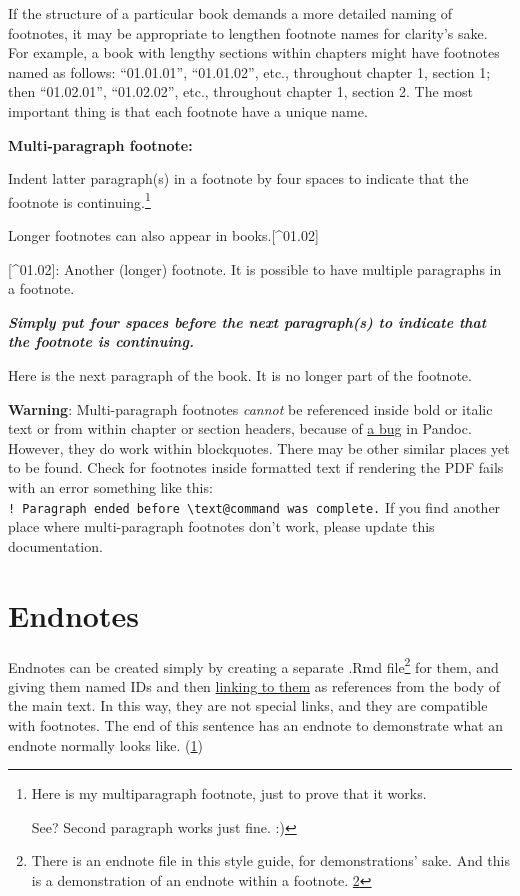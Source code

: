 \documentclass[
  english,
]{book}
\newenvironment{Shaded}{\begin{snugshade}}{\end{snugshade}}
\newcommand{\InformationTok}[1]{\textcolor[rgb]{0.56,0.35,0.01}{\textbf{\textit{#1}}}}
\newcommand{\NormalTok}[1]{#1}
\newcommand{\OtherTok}[1]{\textcolor[rgb]{0.56,0.35,0.01}{#1}}
\begin{document}
If the structure of a particular book demands a more detailed naming of footnotes, it may be appropriate to lengthen footnote names for clarity's sake. For example, a book with lengthy sections within chapters might have footnotes named as follows: ``01.01.01'', ``01.01.02'', etc., throughout chapter 1, section 1; then ``01.02.01'', ``01.02.02'', etc., throughout chapter 1, section 2. The most important thing is that each footnote have a unique name.

\textbf{Multi-paragraph footnote:}

Indent latter paragraph(s) in a footnote by four spaces to indicate that the footnote is continuing.\footnote{Here is my multiparagraph footnote, just to prove that it works.

  See? Second paragraph works just fine. :)}

\begin{Shaded}
\begin{Highlighting}[]
\NormalTok{Longer footnotes can also appear in books.}\OtherTok{[\^{}01.02]}

\OtherTok{[\^{}01.02]: }\NormalTok{Another (longer) footnote. It is possible to have multiple paragraphs in a footnote.}

\InformationTok{    Simply put four spaces before the next paragraph(s) to indicate that the footnote is continuing.}
  
\NormalTok{Here is the next paragraph of the book. It is no longer part of the footnote.}
\end{Highlighting}
\end{Shaded}

\textbf{Warning}: Multi-paragraph footnotes \emph{cannot} be referenced inside bold or italic text or from within chapter or section headers, because of \href{https://github.com/jgm/pandoc/issues/6733}{a bug} in Pandoc. However, they do work within blockquotes. There may be other similar places yet to be found. Check for footnotes inside formatted text if rendering the PDF fails with an error something like this: \texttt{!\ Paragraph\ ended\ before\ \textbackslash{}text@command\ was\ complete.} If you find another place where multi-paragraph footnotes don't work, please update this documentation.

\hypertarget{endnotes}{%
\section{Endnotes}\label{endnotes}}

Endnotes can be created simply by creating a separate .Rmd file\footnote{There is an endnote file in this style guide, for demonstrations' sake. And this is a demonstration of an endnote within a footnote. \protect\hypertarget{en.02.backlink}{\protect\hyperlink{en.02}{2}}} for them, and giving them named IDs and then \protect\hyperlink{linking-to-an-endnote}{linking to them} as references from the body of the main text. In this way, they are not special links, and they are compatible with footnotes. The end of this sentence has an endnote to demonstrate what an endnote normally looks like. (\protect\hypertarget{en.01.backlink}{\protect\hyperlink{en.01}{1}})
\end{document}
